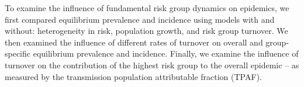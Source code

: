To examine the influence of fundamental risk group dynamics on epidemics, we first
compared equilibrium prevalence and incidence using models with and without:
heterogeneity in risk,
population growth, and
risk group turnover.
We then examined the influence of different rates of turnover on
overall and group-specific equilibrium prevalence and incidence.
Finally, we examine the influence of turnover on the contribution of the
highest risk group to the overall epidemic -- as measured by the
transmission population attributable fraction (TPAF).
